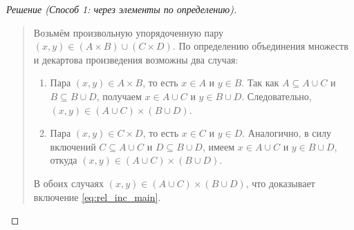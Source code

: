 \begin{proof}[Решение (Способ 1: через элементы по определению)]~\\
    \begin{quote}
        Возьмём произвольную упорядоченную пару 
        $(x, y) \in (A \times B) \cup (C \times D)$. По определению 
        объединения множеств и декартова произведения возможны два случая:
        \begin{enumerate}
            \item Пара $(x, y) \in A \times B$, то есть $x \in A$ и 
            $y \in B$. Так как $A \subseteq A \cup C$ и 
            $B \subseteq B \cup D$, получаем $x \in A \cup C$ и 
            $y \in B \cup D$. Следовательно, 
            $(x, y) \in (A \cup C) \times (B \cup D)$.
            \item Пара $(x, y) \in C \times D$, то есть $x \in C$ и 
            $y \in D$. Аналогично, в силу включений $C \subseteq A \cup C$ 
            и $D \subseteq B \cup D$, имеем $x \in A \cup C$ и 
            $y \in B \cup D$, откуда 
            $(x, y) \in (A \cup C) \times (B \cup D)$.
        \end{enumerate}
        В обоих случаях $(x, y) \in (A \cup C) \times (B \cup D)$, что 
        доказывает включение \eqref{eq:rel_inc_main}.
    \end{quote}
\end{proof}

